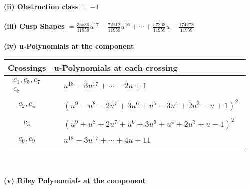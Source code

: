 \documentclass[1p]{elsarticle_modified}
\theoremstyle{definition}
\begin{document}
\flushleft \textbf{(ii) Obstruction class $= -1$}\\~\\
\flushleft \textbf{(iii) Cusp Shapes $= \frac{35580}{11959} u^{17}-\frac{72112}{11959} u^{16}+\cdots+\frac{57268}{11959} u-\frac{174278}{11959}$}\\~\\
\newpage\renewcommand{\arraystretch}{1}
\flushleft \textbf{(iv) u-Polynomials at the component}\newline \\
\begin{tabular}{m{50pt}|m{274pt}}
Crossings & \hspace{64pt}u-Polynomials at each crossing \\
\hline $$\begin{aligned}c_{1},c_{5},c_{7}\\c_{8}\end{aligned}$$&$\begin{aligned}
&u^{18}-3 u^{17}+\cdots-2 u+1
\end{aligned}$\\
\hline $$\begin{aligned}c_{2},c_{4}\end{aligned}$$&$\begin{aligned}
&(u^9- u^8-2 u^7+3 u^6+u^5-3 u^4+2 u^3- u+1)^2
\end{aligned}$\\
\hline $$\begin{aligned}c_{3}\end{aligned}$$&$\begin{aligned}
&(u^9+u^8+2 u^7+u^6+3 u^5+u^4+2 u^3+u-1)^2
\end{aligned}$\\
\hline $$\begin{aligned}c_{6},c_{9}\end{aligned}$$&$\begin{aligned}
&u^{18}-3 u^{17}+\cdots+4 u+11
\end{aligned}$\\
\hline
\end{tabular}\\~\\
\newpage\renewcommand{\arraystretch}{1}
\flushleft \textbf{(v) Riley Polynomials at the component}\newline \\
\end{document}
